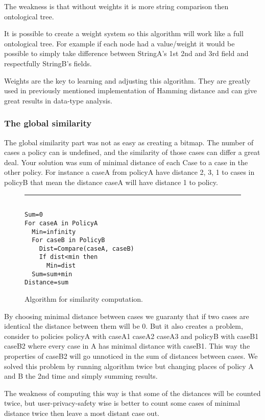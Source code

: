 The weakness is that without weights it is more string comparison then ontological tree.

It is possible to create a weight system so this algorithm will work like a full ontological tree. For example if each node had a value/weight it would be possible to simply take difference between StringA’s 1st 2nd and 3rd field and respectfully StringB’s fields.
 
Weights are the key to learning and adjusting this algorithm. They are greatly used in previously mentioned implementation of Hamming distance and can give great results in data-type analysis.

\subsubsection{ The global similarity }
The global similarity part was not as easy as creating a bitmap. The number of cases a policy can is undefined, and the similarity of those cases can differ a great deal. Your solution was sum of minimal distance of each Case to a case in the other policy. For instance a caseA from policyA have distance 2, 3, 1 to cases in policyB that mean the distance caseA will have distance 1 to policy. 

\begin{figure}[htpb]
\hrule
\begin{verbatim}

Sum=0
For caseA in PolicyA
  Min=infinity
  For caseB in PolicyB
    Dist=Compare(caseA, caseB)
    If dist<min then
      Min=dist
  Sum=sum+min
Distance=sum
\end{verbatim}
\hline
  \caption{Algorithm for similarity computation.}
  \label{similAlgo}
\end{figure}
 

By choosing minimal distance between cases we guaranty that if two cases are identical the distance between them will be 0. But it also creates a problem, consider to policies policyA with {caseA1 caseA2 caseA3} and policyB with {caseB1 caseB2} where every case in A has minimal distance with caseB1. This way the properties of caseB2 will go unnoticed in the sum of distances between cases. We solved this problem by running algorithm twice but changing places of policy A and B the 2nd time and simply summing results.

The weakness of computing this way is that some of the distances will be counted twice, but user-privacy-safety wise is better to count some cases of minimal distance twice then leave a most distant case out.

